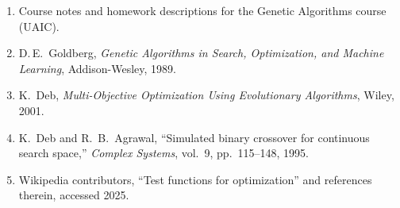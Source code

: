 \documentclass[11pt]{article}
\begin{document}
\begin{enumerate}
  \item[{[1]}] Course notes and homework descriptions for the Genetic
               Algorithms course (UAIC).
  \item[{[2]}] D.\,E. Goldberg, \emph{Genetic Algorithms in Search,
               Optimization, and Machine Learning}, Addison-Wesley, 1989.
  \item[{[3]}] K. Deb, \emph{Multi-Objective Optimization Using Evolutionary
               Algorithms}, Wiley, 2001.
  \item[{[4]}] K. Deb and R. B. Agrawal, ``Simulated binary crossover for
               continuous search space,'' \emph{Complex Systems}, vol.~9,
               pp.~115--148, 1995.
  \item[{[5]}] Wikipedia contributors, ``Test functions for optimization''
               and references therein, accessed 2025.
\end{enumerate}
\end{document}
